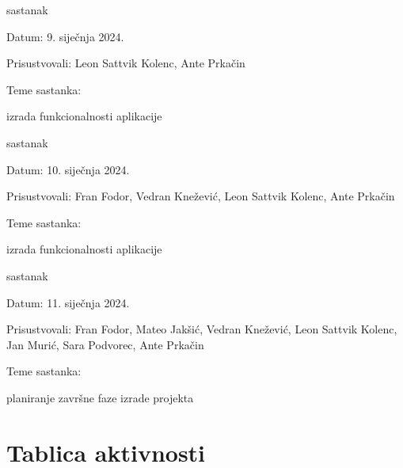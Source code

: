 \begin{packed_enum}
			\item  sastanak
			\item[] \begin{packed_item}
				\item Datum: {9. siječnja 2024.}
				\item Prisustvovali: {Leon Sattvik Kolenc, Ante Prkačin}
				\item Teme sastanka:
				\begin{packed_item}
					\item  izrada funkcionalnosti aplikacije
				\end{packed_item}
			\end{packed_item}

			\item  sastanak
			\item[] \begin{packed_item}
				\item Datum: {10. siječnja 2024.}
				\item Prisustvovali: {Fran Fodor, Vedran Knežević, Leon Sattvik Kolenc, Ante Prkačin}
				\item Teme sastanka:
				\begin{packed_item}
					\item  izrada funkcionalnosti aplikacije
				\end{packed_item}
			\end{packed_item}

			\item  sastanak
			\item[] \begin{packed_item}
				\item Datum: {11. siječnja 2024.}
				\item Prisustvovali: {Fran Fodor, Mateo Jakšić, Vedran Knežević, Leon Sattvik Kolenc, Jan Murić, Sara Podvorec, Ante Prkačin}
				\item Teme sastanka:
				\begin{packed_item}
					\item  planiranje završne faze izrade projekta
				\end{packed_item}
			\end{packed_item}
			
			
		\end{packed_enum}
		
		\eject
		\section*{Tablica aktivnosti}
		
